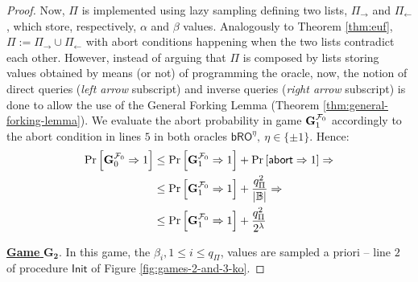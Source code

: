 \documentclass[version=submission, floatrow]{iacrcc}
\begin{document}
\begin{proof}
Now, $\Pi$ is implemented using lazy sampling \cite{RogwayEprint2004} defining two lists, $\Pi_{\rightarrow}$ and $\Pi_{\leftarrow}$, which store, respectively, $\alpha$ and $\beta$ values. Analogously to Theorem \ref{thm:euf}, $\Pi := \Pi_{\rightarrow} \cup \Pi_{\leftarrow}$ with abort conditions happening when the two lists contradict each other.
%
However, instead of arguing that $\Pi$ is composed by lists storing values obtained by means (or not) of programming the oracle, now, the notion of direct queries (\emph{left arrow} subscript) and inverse queries (\emph{right arrow} subscript) is done to allow the use of the General Forking Lemma (Theorem \ref{thm:general-forking-lemma}). 
%
We evaluate the abort probability in game $\mathbf{G}_{1}^{\mathcal{F}_{0}}$ accordingly to the abort condition in lines $5$ in both oracles $\mathsf{bRO}^{\eta},\ \eta \in \{\pm1\}$. 
%
Hence:
\begin{align*}
    \mathrm{Pr}\left[\mathbf{G}_{0}^{\mathcal{F}_{0}} \Rightarrow 1\right] &\le \mathrm{Pr}\left[\mathbf{G}_{1}^{\mathcal{F}_{0}} \Rightarrow 1\right] + \mathrm{Pr}\left[\mathsf{abort} \Rightarrow 1\right] \Rightarrow \\
    &\le \mathrm{Pr}\left[\mathbf{G}_{1}^{\mathcal{F}_{0}} \Rightarrow 1\right] + \dfrac{q_{\Pi}^{2}}{|\mathbb{B}|} \Rightarrow \\
    &\le \mathrm{Pr}\left[\mathbf{G}_{1}^{\mathcal{F}_{0}} \Rightarrow 1\right] + \dfrac{q_{\Pi}^{2}}{2^{\lambda}}
\end{align*}


\noindent\underline{\textbf{Game} $\mathbf{G_{2}}$}. In this game, the $\beta_{i}, 1 \le i \le q_{\Pi}$, values are sampled a priori -- line $2$ of procedure $\mathsf{Init}$ of Figure \ref{fig:games-2-and-3-ko}. 


\end{proof}
\end{document}
